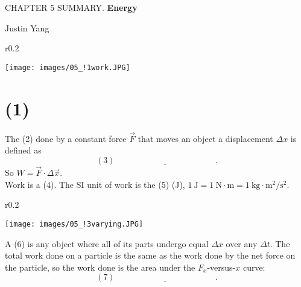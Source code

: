 \documentclass[11pt,a4paper]{report}
\begin{document}
\pagestyle{empty}
\setcounter{secnumdepth}{0}

\begin{center}
\Large{CHAPTER 5 SUMMARY. \textbf{Energy}}

\large{Justin Yang}

\end{center}

\begin{wrapfigure}{r}{0.2\textwidth}
\vspace{-20pt}
\begin{center}
\texttt{[image: images/05\_!1work.JPG]}
\end{center}
\end{wrapfigure}
\section{(1)\underline{\hspace{3cm}}}
The (2)\underline{\hspace{3cm}} done by a constant force $\vec{F}$ that moves an object a displacement $\Delta{x}$ is defined as $$\left(3\right)\underline{\hspace{5cm}}.$$ So $W = \vec{F} \cdot \Delta{\vec{x}}$.
\\Work is a (4)\underline{\hspace{2cm}}. The SI unit of work is the (5)\underline{\hspace{2cm}} (J), $1 \mathrm{\ J} = 1 \mathrm{\ N} \cdot \mathrm{m} = 1 \mathrm{\ kg} \cdot \mathrm{m}^2 / \mathrm{s}^2$.

\smallskip

\begin{wrapfigure}{r}{0.2\textwidth}
\vspace{-20pt}
\begin{center}
\texttt{[image: images/05\_!3varying.JPG]}
\end{center}
\end{wrapfigure}

\noindent
A (6)\underline{\hspace{2cm}} is any object where all of its parts undergo equal $\Delta{x}$ over any $\Delta{t}$. The total work done on a particle is the same as the work done by the net force on the particle, so the work done is the area under the $F_x$-versus-$x$ curve: $$\left(7\right)\underline{\hspace{5cm}}.$$
\end{document}
